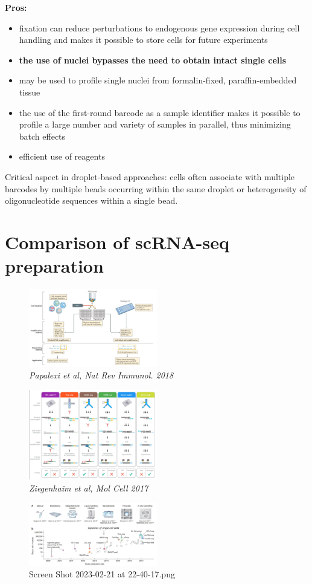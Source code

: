 \textbf{Pros:}

\begin{itemize}
\tightlist
\item
  fixation can reduce perturbations to endogenous gene expression during
  cell handling and makes it possible to store cells for future
  experiments
\item
  \textbf{the use of nuclei bypasses the need to obtain intact single
  cells}
\item
  may be used to profile single nuclei from formalin-fixed,
  paraffin-embedded tissue
\item
  the use of the first-round barcode as a sample identifier makes it
  possible to profile a large number and variety of samples in parallel,
  thus minimizing batch effects
\item
  efficient use of reagents
\end{itemize}

Critical aspect in droplet-based approaches: cells often associate with
multiple barcodes by multiple beads occurring within the same droplet or
heterogeneity of oligonucleotide sequences within a single bead.

\section{Comparison of scRNA-seq preparation}

\begin{figure}
\centering
\includegraphics[width=0.5\textwidth]{images/Screen_Shot_2023-02-21_at_22-35-31.png}
\caption{\emph{Papalexi et al, Nat Rev Immunol. 2018}}
\end{figure}

\begin{figure}
\centering
\includegraphics[width=0.5\textwidth]{images/Screen_Shot_2023-02-21_at_22-36-08.png}
\caption{\emph{Ziegenhaim et al, Mol Cell 2017}}
\end{figure}

\begin{figure}
\centering
\includegraphics[width=0.5\textwidth]{images/Screen_Shot_2023-02-21_at_22-40-17.png}
\caption{Screen Shot 2023-02-21 at 22-40-17.png}
\end{figure}

